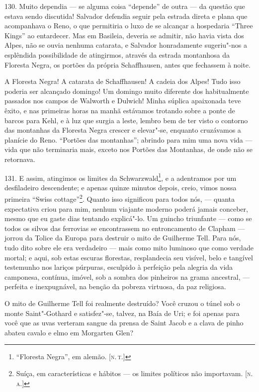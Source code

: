 130. Muito dependia --- se alguma coisa ``depende'' de outra --- da
questão que estava sendo discutida! Salvador defendia seguir pela
estrada direta e plana que acompanhava o Reno, o que permitiria o luxo
de se alcançar a hospedaria ``Three Kings'' ao entardecer. Mas em
Basileia, deveria se admitir, não havia vista dos Alpes, não se ouvia
nenhuma catarata, e Salvador honradamente sugeriu"-nos a esplêndida
possibilidade de atingirmos, através da estrada montanhosa da Floresta
Negra, os portões da própria Schaffhausen, antes que fechassem à noite.

A Floresta Negra! A catarata de Schaffhausen! A cadeia dos Alpes! Tudo
isso poderia ser alcançado domingo! Um domingo muito diferente dos
habitualmente passados nos campos de Walworth e Dulwich! Minha súplica
apaixonada teve êxito, e nas primeiras horas na manhã estávamos trotando
sobre a ponte de barcos para Kehl, e à luz que surgia a leste, lembro
bem de ter visto o contorno das montanhas da Floresta Negra crescer e
elevar"-se, enquanto cruzávamos a planície do Reno. ``Portões das
montanhas''; abrindo para mim uma nova vida --- vida que não terminaria
mais, exceto nos Portões das Montanhas, de onde não se retornava.

131. E assim, atingimos os limites da Schwarzwald\footnote{``Floresta
  Negra'', em alemão. {[}\textsc{n.\,t.}{]}}, e a adentramos por um
desfiladeiro descendente; e apenas quinze minutos depois, creio, vimos
nossa primeira ``Swiss cottage''\footnote{Suíça, em características e
  hábitos --- os limites políticos não importavam. {[}\textsc{n.\,a.}{]}}.
Quanto isso significou para todos nós, --- quanta expectativa criou para
mim, nenhum viajante moderno poderá jamais conceber, mesmo que eu gaste
dias tentando explicá"-lo. Um guincho triunfante --- como se todos os
silvos das ferrovias se encontrassem no entroncamento de Clapham ---
jorrou da Tolice da Europa para destruir o mito de Guilherme Tell. Para
nós, tudo dito sobre ele era verdadeiro --- mais como mito luminoso que
como verdade mortal; e aqui, sob estas escuras florestas, resplandecia
seu visível, belo e tangível testemunho nos lariços púrpuras, esculpido
à perfeição pela alegria da vida camponesa, contínua, imóvel, sob a
sombra dos pinheiros na grama ancestral, --- perfeita e inexpugnável, na
benção da pobreza virtuosa, da paz religiosa.

O mito de Guilherme Tell foi realmente destruído? Você cruzou o túnel
sob o monte Saint"-Gothard e satisfez"-se, talvez, na Baía de Uri; e foi
apenas para você que as uvas verteram sangue da prensa de Saint Jacob e
a clava de pinho abateu cavalo e elmo em Morgarten Glen?


